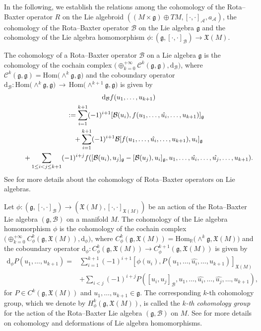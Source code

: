 \documentclass[pdftex]{sigma}%
\numberwithin{equation}{section}
\newcommand{\g}{\mathfrak g}
\newcommand{\Real}{\mathbb R}
\newcommand{\huaA}{\mathcal{A}}
\newcommand{\huaB}{\mathcal{B}}
\newcommand{\huaC}{\mathcal{C}}
\newcommand{\frkX}{\mathfrak X}
\newcommand{\lon }{\,\rightarrow\,}
\newcommand{\dM}{\mathrm{d}}
\newcommand{\Hom}{\mathrm{Hom}}
\begin{document}
In the following, we establish the relations among the cohomology of the Rota--Baxter operator $R$ on the Lie algebroid $((M \times\g)\oplus TM,[\cdot,\cdot]_{\huaA},a_{\huaA})$, the cohomology of the Rota--Baxter operator $\huaB$ on the Lie algebra $\g$ and the cohomology of the Lie algebra homomorphism $\phi\colon (\g, [\cdot,\cdot]_\huaB)\to\mathfrak{X}(M)$.

The cohomology of a Rota--Baxter operator $\huaB$ on a Lie algebra $\g$ is the cohomology of the cochain complex $\big({\oplus}_{k=0}^{+\infty}\huaC^k(\g,\g),\dM_\huaB\big)$, where $ \huaC^k(\g,\g)=\Hom\big({\wedge}^k\g,\g\big)$ and the coboundary operator $\dM_\huaB\colon \Hom\big({\wedge}^k\g,\g\big)\lon \Hom\big({\wedge}^{k+1}\g,\g\big)$ is given by
\begin{gather*}
 \dM_\huaB f(u_1,\dots,u_{k+1})
 \\ \qquad
{}:=\sum_{i=1}^{k+1}(-1)^{i+1}[\huaB(u_i),f(u_1,\dots,\hat{u_i},\dots, u_{k+1})]_\g
\\ \qquad\hphantom{=}
{}+\sum_{i=1}^{k+1}(-1)^{i+1}\huaB[f(u_1,\dots,\hat{u_i},\dots, u_{k+1}),u_i]_\g
\\ \qquad\hphantom{=}
{}+\sum_{1\le i<j\le k+1}(-1)^{i+j}f([\huaB(u_i),u_j]_\g-[\huaB(u_j),u_i]_\g,u_1,\dots,\hat{u_i},\dots,\hat{u_j},\dots, u_{k+1}).%
\end{gather*}
See \cite{TBGS} for more details about the cohomology of Rota--Baxter operators on Lie algebras.

Let $\phi \colon (\g, [\cdot,\cdot]_\huaB)\to(\mathfrak{X}(M),[\cdot,\cdot]_{\frkX(M)})$ be an action of the Rota--Baxter Lie algebra $(\g,\huaB)$ on a manifold $M$. The cohomology of the Lie algebra homomorphism $\phi $ is the cohomology of the cochain complex
$\big({\oplus}_{k=0}^{+\infty}C_\phi^k(\g,\mathfrak{X}(M)),\dM_\phi\big)$, where $C_\phi^k(\g,\mathfrak{X}(M))=\Hom_\Real\big({\wedge}^k \g, \mathfrak{X}(M)\big)$ and the coboundary operator $\dM_\phi\colon C_\phi^k(\g,\mathfrak{X}(M))\to C_\phi^{k+1}(\g,\mathfrak{X}(M))$ is given by
\begin{align*}
\dM_\phi P(u_1,\dots,u_{k+1})={}&\sum_{i=1}^{k+1}(-1)^{i+1} [\phi(u_i),P(u_1,\dots,\hat{u_i},\dots,u_{k+1})]_{\mathfrak{X}(M)}
\\
&+\sum_{i<j}(-1)^{i+j}P([u_i,u_j]_\huaB,u_1,\dots,\hat{u_i},\dots,\hat{u_j},\dots,u_{k+1}),
\end{align*}
for $P\in C^k(\g,\mathfrak{X}(M)) $ and $u_1,\dots,u_{k+1}\in \g$. The corresponding $k$-th cohomology group, which we denote by $H_{\phi}^k(\g,\mathfrak{X}(M))$, is called the {\it $k$-th cohomology group} for the action of the Rota--Baxter Lie algebra $(\g,\huaB)$ on $M$. See \cite{Fregier,NR2} for more details on cohomology and deformations of Lie algebra homomorphisms.
\end{document}
